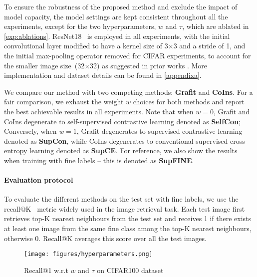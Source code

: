 \documentclass[10pt,twocolumn,letterpaper]{article}
\begin{document}
To ensure the robustness of the proposed method and exclude the impact of model capacity, the model settings are kept consistent throughout all the experiments, except for the two hyperparameters, $w$ and $\tau$, which are ablated in \cref{exp:ablations}.
ResNet18~\cite{resnet} is employed in all experiments, with the initial convolutional layer modified to have a kernel size of 3$\times$3 and a stride of 1, and the initial max-pooling operator removed for CIFAR experiments, to account for the smaller image size~(32$\times$32) as suggested in prior works \cite{moco}. More implementation and dataset details can be found in \cref{appendixa}.




We compare our method with two competing methods: \textbf{Grafit} and \textbf{CoIns}. For a fair comparison, we exhaust the weight $w$ choices for both methods and report the best achievable results in all experiments. Note that when $w=0$, Grafit and CoIns degenerate to self-supervised contrastive learning denoted as \textbf{SelfCon}; Conversely, when $w=1$, Grafit degenerates to supervised contrastive learning~\cite{supcon} denoted as \textbf{SupCon}, while CoIns degenerates to conventional supervised cross-entropy learning denoted as \textbf{SupCE}. 
For reference, we also show the results when training with fine labels -- this is denoted as \textbf{SupFINE}. 
\paragraph{Evaluation protocol}
To evaluate the different methods on the test set with fine labels, we use the recall@K~\cite{oh2016recallretrieval} metric widely used in the image retrieval task. Each test image first retrieves top-K nearest neighbours from the test set and receives 1 if there exists at least one image from the same fine class among the top-K nearest neighbours, otherwise 0. Recall@K averages this score over all the test images.
\begin{figure}[htbp]
    \centering
    \texttt{[image: figures/hyperparameters.png]}
    \caption{Recall@1 w.r.t $w$ and $\tau$ on CIFAR100 dataset}
    \label{fig:hyperparameters}
\end{figure}
\end{document}
